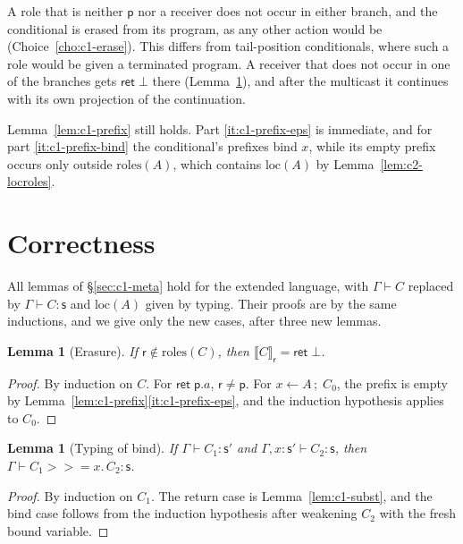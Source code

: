 \documentclass[11pt]{report}
\theoremstyle{plain}
\newtheorem{lemma}[theorem]{Lemma}
\theoremstyle{definition}
\theoremstyle{remark}
\newcommand{\kw}[1]{\mathsf{#1}}
\newcommand{\pp}{\mathsf{p}}
\newcommand{\rr}{\mathsf{r}}
\newcommand{\sr}{\mathsf{s}}
\newcommand{\bind}[3]{#1 \leftarrow #2\,;\;#3}
\newcommand{\cret}[1]{\kw{ret}\;#1}
\newcommand{\mbind}[3]{#1 \mathbin{>\!\!>\!\!=} #2.\,#3}
\newcommand{\roles}[1]{\mathrm{roles}(#1)}
\newcommand{\loc}[1]{\mathrm{loc}(#1)}
\newcommand{\proj}[2]{\llbracket #1 \rrbracket_{#2}}
\begin{document}
A role that is neither $\pp$ nor a receiver does not occur in either branch,
and the conditional is erased from its program, as any other action would be
(Choice~\ref{cho:c1-erase}).  This differs from tail-position conditionals,
where such a role would be given a terminated program.  A receiver that does
not occur in one of the branches gets $\kw{ret}\;\bot$ there
(Lemma~\ref{lem:c2-erase}), and after the multicast it continues with its
own projection of the continuation.

Lemma~\ref{lem:c1-prefix} still holds.  Part \ref{it:c1-prefix-eps} is
immediate, and for part \ref{it:c1-prefix-bind} the conditional's prefixes
bind $x$, while its empty prefix occurs only outside $\roles{A}$, which
contains $\loc{A}$ by Lemma~\ref{lem:c2-locroles}.

\section{Correctness}
\label{sec:c2-correct}

All lemmas of \S\ref{sec:c1-meta} hold for the extended language, with
$\Gamma\vdash C$ replaced by $\Gamma\vdash C:\sr$ and $\loc{A}$ given by
typing.  Their proofs are by the same inductions, and we give only the new
cases, after three new lemmas.

\begin{lemma}[Erasure]\label{lem:c2-erase}
  If $\rr\notin\roles{C}$, then $\proj{C}{\rr}=\kw{ret}\;\bot$.
\end{lemma}
\begin{proof}
  By induction on $C$.  For $\cret{\pp.a}$, $\rr\neq\pp$.  For
  $\bind{x}{A}{C_0}$, the prefix is empty by
  Lemma~\ref{lem:c1-prefix}\ref{it:c1-prefix-eps}, and the induction
  hypothesis applies to $C_0$.
\end{proof}

\begin{lemma}[Typing of bind]\label{lem:c2-tbind}
  If $\Gamma\vdash C_1:\sr'$ and $\Gamma,x{:}\sr'\vdash C_2:\sr$, then
  $\Gamma\vdash\mbind{C_1}{x}{C_2}:\sr$.
\end{lemma}
\begin{proof}
  By induction on $C_1$.  The return case is Lemma~\ref{lem:c1-subst}, and the
  bind case follows from the induction hypothesis after weakening $C_2$ with
  the fresh bound variable.
\end{proof}
\end{document}
